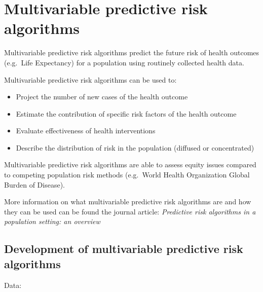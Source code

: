 \documentclass[]{book}
\providecommand{\tightlist}{%
  \setlength{\itemsep}{0pt}\setlength{\parskip}{0pt}}
\begin{document}
\section{Multivariable predictive risk
algorithms}\label{multivariable-predictive-risk-algorithms}

Multivariable predictive risk algorithms predict the future risk of
health outcomes (e.g.~Life Expectancy) for a population using routinely
collected health data.

Multivariable predictive risk algorithms can be used to:

\begin{itemize}
\tightlist
\item
  Project the number of new cases of the health outcome
\item
  Estimate the contribution of specific risk factors of the health
  outcome
\item
  Evaluate effectiveness of health interventions
\item
  Describe the distribution of risk in the population (diffused or
  concentrated)
\end{itemize}

Multivariable predictive risk algorithms are able to assess equity
issues compared to competing population risk methods (e.g.~World Health
Organization Global Burden of Disease).

More information on what multivariable predictive risk algorithms are
and how they can be used can be found the journal article:
\emph{Predictive risk algorithms in a population setting: an overview}
\citep{PoRTover}

\subsection{Development of multivariable predictive risk
algorithms}\label{development-of-multivariable-predictive-risk-algorithms}

Data:
\end{document}
